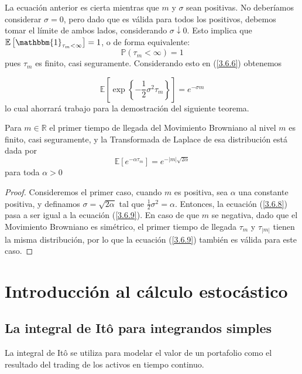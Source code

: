 \documentclass[11pt,notitlepage]{article}
\begin{document}
La ecuación anterior es cierta mientras que \(m\) y \(\sigma\) sean positivas. No deberíamos considerar \(\sigma=0\), pero dado que es válida para todos los positivos, debemos tomar el límite de ambos lados, considerando \(\sigma \downarrow 0\). Esto implica que \(\mathbb{E}\left[\mathbbm{1}_{\tau_m<\infty}\right]=1\), o de forma equivalente:
\begin{equation} \label{3.6.7}
    \mathbb{P}(\tau_m<\infty)=1
\end{equation}
pues \(\tau_m\) es finito, casi seguramente. Considerando esto en (\ref{3.6.6}) obtenemos

\begin{equation} \label{3.6.8}
    \mathbb{E}\left[\exp\left\{-\frac{1}{2}\sigma^2 \tau_m\right\} \right]= e^{-\sigma m}
\end{equation}
lo cual ahorrará trabajo para la demostración del siguiente teorema.

\begin{teor} \label{Secc1.16_Teorema2}
Para \(m \in \mathbb{R}\) el primer tiempo de llegada del Movimiento Browniano al nivel \(m\) es finito, casi seguramente, y la Transformada de Laplace de esa distribución está dada por 
\begin{equation} \label{3.6.9}
    \mathbb{E}[e^{-\alpha \tau_m}] = e^{-|m|\sqrt{2\alpha}}
\end{equation}
para toda \(\alpha>0\)
\end{teor}
\begin{proof}
Consideremos el primer caso, cuando \(m\) es positiva, sea \(\alpha\) una constante positiva, y definamos \(\sigma=\sqrt{2\alpha} \) tal que \(\frac{1}{2}\sigma^2=\alpha\). Entonces, la ecuación (\ref{3.6.8}) pasa a ser igual a la ecuación (\ref{3.6.9}). En caso de que \(m\) se negativa, dado que el Movimiento Browniano es simétrico, el primer tiempo de llegada \(\tau_m\) y \(\tau_{|m|}\) tienen la misma distribución, por lo que la ecuación (\ref{3.6.9}) también es válida para este caso.
\end{proof}

\newpage    
\section{Introducción al cálculo estocástico}


\subsection{ La integral de Itô para integrandos simples }
La integral de Itô se utiliza para modelar el valor de un portafolio como el resultado del trading de los activos en tiempo continuo. \\
\end{document}
